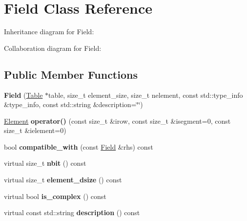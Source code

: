 \hypertarget{classField}{}\section{Field Class Reference}
\label{classField}


Inheritance diagram for Field\+:


Collaboration diagram for Field\+:
\subsection*{Public Member Functions}
\begin{DoxyCompactItemize}
\item 
{\bfseries Field} (\hyperlink{classTable}{Table} $\ast$table, size\+\_\+t element\+\_\+size, size\+\_\+t nelement, const std\+::type\+\_\+info \&type\+\_\+info, const std\+::string \&description=\char`\"{}\char`\"{})\hypertarget{classField_a99a8a91be12a04cfbf796655d1bdc43d}{}\label{classField_a99a8a91be12a04cfbf796655d1bdc43d}

\item 
\hyperlink{classElement}{Element} {\bfseries operator()} (const size\+\_\+t \&irow, const size\+\_\+t \&isegment=0, const size\+\_\+t \&ielement=0)\hypertarget{classField_aec27d013e8544087b0aafa457f5c366e}{}\label{classField_aec27d013e8544087b0aafa457f5c366e}

\item 
bool {\bfseries compatible\+\_\+with} (const \hyperlink{classField}{Field} \&rhs) const \hypertarget{classField_aebde47e87596764d7862ed15e4e5985d}{}\label{classField_aebde47e87596764d7862ed15e4e5985d}

\item 
virtual size\+\_\+t {\bfseries nbit} () const \hypertarget{classField_ace43d6bf3c0d9daeda885e6c0341daba}{}\label{classField_ace43d6bf3c0d9daeda885e6c0341daba}

\item 
virtual size\+\_\+t {\bfseries element\+\_\+dsize} () const \hypertarget{classField_a8fd3669ef9680dd50c7d2fb861fbd758}{}\label{classField_a8fd3669ef9680dd50c7d2fb861fbd758}

\item 
virtual bool {\bfseries is\+\_\+complex} () const \hypertarget{classField_ab058d452a9187782ff3d32bbf4155e21}{}\label{classField_ab058d452a9187782ff3d32bbf4155e21}

\item 
virtual const std\+::string {\bfseries description} () const \hypertarget{classField_a08330e74f21963329bbcdd2609b5d77e}{}\label{classField_a08330e74f21963329bbcdd2609b5d77e}


\end{DoxyCompactItemize}

